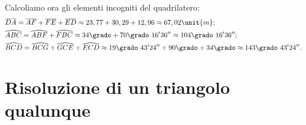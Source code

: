 \begin{esempio}
Calcoliamo ora gli elementi incogniti del quadrilatero:
\begin{align*}
&\overline{DA}=\overline{AF}+\overline{FE}+\overline{ED}\approx23,77+30,29+12,
96\approx67,02\unit{m};\\
&\widehat{ABC}=\widehat{ABF}+\widehat{FBC}\approx34\grado+70\grado~16' 
36''\approx104\grado~16' 36'';\\
&\widehat{BCD}= \widehat{BCG}+\widehat{GCE}+\widehat{ECD}\approx19\grado~43' 
24''+90\grado+34\grado\approx143\grado~43' 24''.
\end{align*}
\end{esempio}

% 

\section{Risoluzione di un triangolo qualunque}
\label{sec:trigo_triangoloqualunque}

